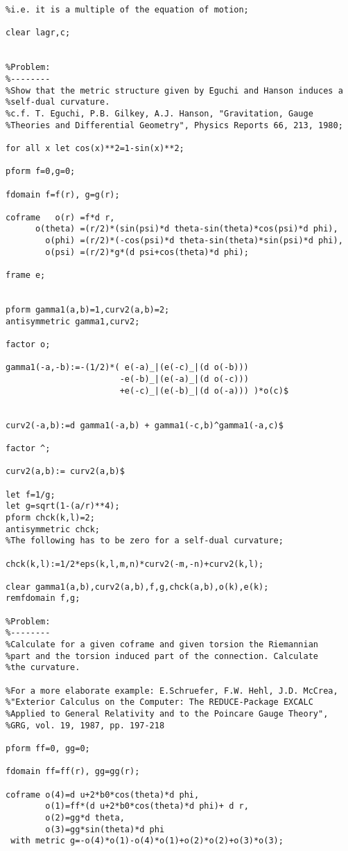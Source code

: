 {\begin{verbatim}
%i.e. it is a multiple of the equation of motion;

clear lagr,c;


%Problem:
%--------
%Show that the metric structure given by Eguchi and Hanson induces a
%self-dual curvature.
%c.f. T. Eguchi, P.B. Gilkey, A.J. Hanson, "Gravitation, Gauge 
%Theories and Differential Geometry", Physics Reports 66, 213, 1980;

for all x let cos(x)**2=1-sin(x)**2;

pform f=0,g=0;

fdomain f=f(r), g=g(r);

coframe   o(r) =f*d r,
      o(theta) =(r/2)*(sin(psi)*d theta-sin(theta)*cos(psi)*d phi),
        o(phi) =(r/2)*(-cos(psi)*d theta-sin(theta)*sin(psi)*d phi),
        o(psi) =(r/2)*g*(d psi+cos(theta)*d phi);

frame e;


pform gamma1(a,b)=1,curv2(a,b)=2;
antisymmetric gamma1,curv2;

factor o;

gamma1(-a,-b):=-(1/2)*( e(-a)_|(e(-c)_|(d o(-b)))
                       -e(-b)_|(e(-a)_|(d o(-c)))
                       +e(-c)_|(e(-b)_|(d o(-a))) )*o(c)$


curv2(-a,b):=d gamma1(-a,b) + gamma1(-c,b)^gamma1(-a,c)$

factor ^;

curv2(a,b):= curv2(a,b)$

let f=1/g;
let g=sqrt(1-(a/r)**4);
pform chck(k,l)=2;
antisymmetric chck;
%The following has to be zero for a self-dual curvature;

chck(k,l):=1/2*eps(k,l,m,n)*curv2(-m,-n)+curv2(k,l);

clear gamma1(a,b),curv2(a,b),f,g,chck(a,b),o(k),e(k);
remfdomain f,g;

%Problem:
%--------
%Calculate for a given coframe and given torsion the Riemannian 
%part and the torsion induced part of the connection. Calculate 
%the curvature.

%For a more elaborate example: E.Schruefer, F.W. Hehl, J.D. McCrea,
%"Exterior Calculus on the Computer: The REDUCE-Package EXCALC 
%Applied to General Relativity and to the Poincare Gauge Theory",
%GRG, vol. 19, 1987, pp. 197-218

pform ff=0, gg=0;

fdomain ff=ff(r), gg=gg(r);

coframe o(4)=d u+2*b0*cos(theta)*d phi,
        o(1)=ff*(d u+2*b0*cos(theta)*d phi)+ d r,
        o(2)=gg*d theta,
        o(3)=gg*sin(theta)*d phi
 with metric g=-o(4)*o(1)-o(4)*o(1)+o(2)*o(2)+o(3)*o(3);


\end{verbatim}}
